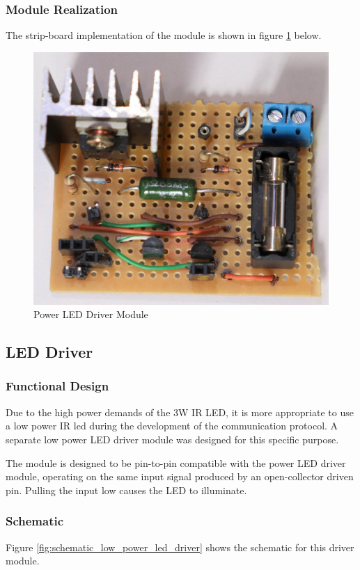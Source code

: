 \subsubsection{Module Realization}
The strip-board implementation of the module is shown in figure \ref{fig:module_power_led_driver} below.

\begin{figure}[H]
	\centering
	\includegraphics[width=.6\textwidth]{figures/modules/power_led_driver.jpg}
	\caption{Power LED Driver Module}
	\label{fig:module_power_led_driver}
\end{figure}







\subsection{LED Driver}

\subsubsection{Functional Design}
Due to the high power demands of the 3W IR LED, it is more appropriate to use a low power IR led during the development of the communication protocol. A separate low power LED driver module was designed for this specific purpose.

The module is designed to be pin-to-pin compatible with the power LED driver module, operating on the same input signal produced by an open-collector driven pin. Pulling the input low causes the LED to illuminate.



\subsubsection{Schematic}
Figure \ref{fig:schematic_low_power_led_driver} shows the schematic for this driver module.

